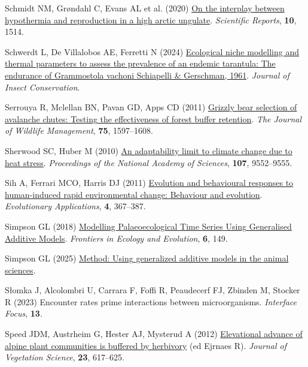 \documentclass[
  12pt,
]{article}
\newlength{\cslhangindent}
\newenvironment{CSLReferences}[2] %
 {\begin{list}{}{%
  \setlength{\itemindent}{0pt}
  \setlength{\leftmargin}{0pt}
  \setlength{\parsep}{0pt}
  \ifodd #1
   \setlength{\leftmargin}{\cslhangindent}
   \setlength{\itemindent}{-1\cslhangindent}
  \fi
  \setlength{\itemsep}{#2\baselineskip}}}
 {\end{list}}
\begin{document}
\begin{CSLReferences}{1}{0}
Schmidt NM, Grøndahl C, Evans AL et al. (2020) \href{https://doi.org/10.1038/s41598-020-58298-8}{On the interplay between hypothermia and reproduction in a high arctic ungulate}. \emph{Scientific Reports}, \textbf{10}, 1514.

Schwerdt L, De Villalobos AE, Ferretti N (2024) \href{https://doi.org/10.1007/s10841-024-00595-y}{Ecological niche modelling and thermal parameters to assess the prevalence of an endemic tarantula: The endurance of {Grammostola} vachoni {Schiapelli} \& {Gerschman}, 1961}. \emph{Journal of Insect Conservation}.

Serrouya R, Mclellan BN, Pavan GD, Apps CD (2011) \href{https://doi.org/10.1002/jwmg.196}{Grizzly bear selection of avalanche chutes: {Testing} the effectiveness of forest buffer retention}. \emph{The Journal of Wildlife Management}, \textbf{75}, 1597--1608.

Sherwood SC, Huber M (2010) \href{https://doi.org/10.1073/pnas.0913352107}{An adaptability limit to climate change due to heat stress}. \emph{Proceedings of the National Academy of Sciences}, \textbf{107}, 9552--9555.

Sih A, Ferrari MCO, Harris DJ (2011) \href{https://doi.org/10.1111/j.1752-4571.2010.00166.x}{Evolution and behavioural responses to human-induced rapid environmental change: {Behaviour} and evolution}. \emph{Evolutionary Applications}, \textbf{4}, 367--387.

Simpson GL (2018) \href{https://doi.org/10.3389/fevo.2018.00149}{Modelling {Palaeoecological} {Time} {Series} {Using} {Generalised} {Additive} {Models}}. \emph{Frontiers in Ecology and Evolution}, \textbf{6}, 149.

Simpson GL (2025) \href{https://doi.org/10.48550/ARXIV.2507.06281}{Method: {Using} generalized additive models in the animal sciences}.

Słomka J, Alcolombri U, Carrara F, Foffi R, Peaudecerf FJ, Zbinden M, Stocker R (2023) Encounter rates prime interactions between microorganisms. \emph{Interface Focus}, \textbf{13}.

Speed JDM, Austrheim G, Hester AJ, Mysterud A (2012) \href{https://doi.org/10.1111/j.1654-1103.2012.01391.x}{Elevational advance of alpine plant communities is buffered by herbivory} (ed Ejrnaes R). \emph{Journal of Vegetation Science}, \textbf{23}, 617--625.


\end{CSLReferences}
\end{document}
